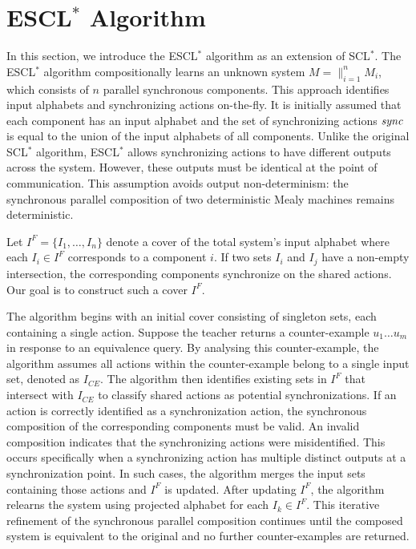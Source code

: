 \section{ESCL$^*$ Algorithm}\label{sec:SCLAlg}
	In this section, we introduce the ESCL$^*$ algorithm as an extension of SCL$^*$\cite{samadi}. The  ESCL$^*$  algorithm compositionally learns an unknown system $M = \parallel_{i=1}^n M_i$, which consists of $n$ parallel synchronous components. 
	This approach identifies input alphabets and synchronizing actions on-the-fly.  It is initially assumed that each component has an input alphabet 
	and 
	the set of synchronizing actions  $\it sync$ is equal to the union of the input alphabets of all components. Unlike the original SCL$^*$ algorithm,  ESCL$^*$ allows synchronizing actions to have different outputs across the system. However, these outputs must be identical at the point of communication. This assumption avoids
	output non-determinism: the synchronous parallel composition of two deterministic Mealy machines remains deterministic.
	

Let $I^F = \{I_1,\dots, I_n\}$  denote a cover of the total system’s input alphabet where each $I_i\in I^F$ corresponds to a component $i$. If two sets 
$I_i$ and $I_j$ 
 have a non-empty intersection, the corresponding components synchronize on the shared actions. Our goal is to construct such a cover $I^F$.


The algorithm begins with an initial cover consisting of singleton sets, each containing a single action. Suppose the teacher returns a counter-example 
$u_1\ldots u_m$
 in response to an equivalence query. By analysing this counter-example, %
 the algorithm assumes all actions within the counter-example belong to a single input set, denoted as $I_{\mathit{CE}}$.
 The algorithm then identifies existing sets in $I^F$ that intersect with $I_{\mathit{CE}}$ to classify shared actions as potential synchronizations.
If an action is correctly identified as a synchronization action, the synchronous composition of the corresponding components must be valid.
An invalid composition indicates that the synchronizing actions were misidentified. This occurs specifically when a synchronizing action has multiple distinct outputs at a synchronization point.
In such cases, the algorithm merges the input sets containing those actions and $I^F$ is updated.
 After updating 
$I^F$, the algorithm relearns the system using  projected alphabet for each 
$I_k\in I^F$. This iterative refinement of the synchronous parallel composition continues until the composed system is equivalent to the original and no further counter-examples are returned.

